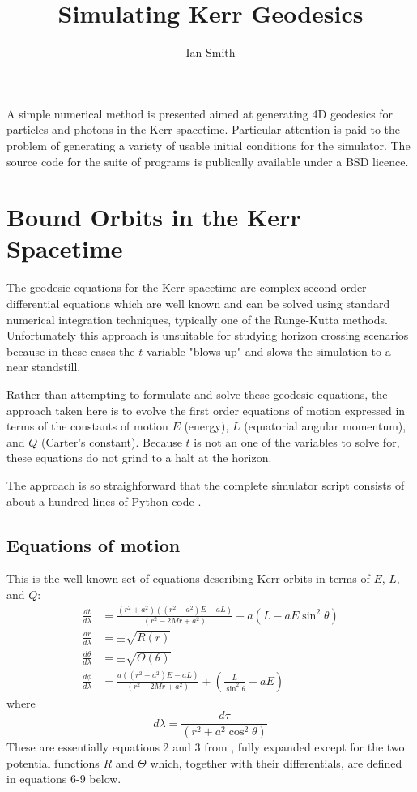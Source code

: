 \documentclass[11pt]{article}
\title{\textbf{Simulating Kerr Geodesics}}
\author{Ian Smith}
\date{}
\begin{document}
\maketitle

\abstract
A simple numerical method is presented aimed at generating 4D geodesics for particles and photons in the Kerr spacetime.  Particular attention is paid to the problem of generating a variety of usable initial conditions for the simulator.  The source code for the suite of programs is publically available under a BSD licence.

\section{Bound Orbits in the Kerr Spacetime}

The geodesic equations for the Kerr spacetime are complex second order differential equations which are well known and can be solved using standard numerical integration techniques, typically one of the Runge-Kutta methods.  Unfortunately this approach is unsuitable for studying horizon crossing scenarios because in these cases the $t$ variable "blows up" and slows the simulation to a near standstill.

Rather than attempting to formulate and solve these geodesic equations, the approach taken here is to evolve the first order equations of motion expressed in terms of the constants of motion $E$ (energy), $L$ (equatorial angular momentum), and $Q$ (Carter's constant).  Because $t$ is not an one of the variables to solve for, these equations do not grind to a halt at the horizon.

The approach is so straighforward that the complete simulator script consists of about a hundred lines of Python code \cite{m4r35n357}.

\subsection {Equations of motion}

This is the well known set of equations describing Kerr orbits in terms of $E$, $L$, and $Q$:
\begin{align}
\frac{d t}{d \lambda} &= \frac{(r^2 + a^2) \left((r^2 + a^2) E - aL \right)} {(r^2 - 2Mr  + a^2)} + a(L - aE \sin^2 \theta) \\
\frac{d r}{d \lambda} &= \pm \sqrt {R(r)} \\
\frac{d \theta}{d \lambda} &= \pm \sqrt {\Theta (\theta)} \\
\frac{d \phi}{d \lambda} &= \frac{a \left((r^2 + a^2) E - aL \right)} {(r^2 - 2Mr  + a^2)} + \left(\frac {L} {\sin^2 \theta} -aE \right)
\end{align}
where
\begin{equation}
d \lambda = \frac {d \tau} {(r^2 + a^2 \cos^2\theta)}
\end{equation}
These are essentially equations 2 and 3 from \cite{wilkins}, fully expanded except for the two potential functions $R$ and $\Theta$ which, together with their differentials, are defined in equations 6-9 below.
\end{document}
